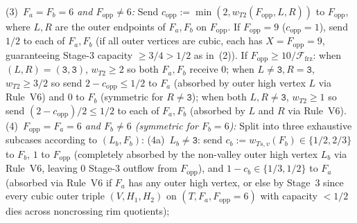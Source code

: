 \documentclass[11pt,reqno]{amsart}
\theoremstyle{plain}
\theoremstyle{definition}
\theoremstyle{remark}
\newcommand{\Ffrz}{\mathcal{F}_{\mathrm{frz}}}
\DeclareRobustCommand{\_}{\ifmmode\text{\textunderscore}\else\textunderscore\allowbreak\fi}
\begin{document}
\begin{itemize}[leftmargin=1.8em]
\begin{enumerate}[label=(\roman*),leftmargin=2.0em]
\begin{itemize}[leftmargin=1.4em]
          (3)~\emph{$F_a = F_b = 6$ and $F_{\mathrm{opp}} \neq 6$:} Send $c_{\mathrm{opp}} := \min(2, w_{T2}(F_{\mathrm{opp}}, L, R))$ to $F_{\mathrm{opp}}$, where $L, R$ are the outer endpoints of $F_a, F_b$ on $F_{\mathrm{opp}}$. If $F_{\mathrm{opp}} = 9$ ($c_{\mathrm{opp}} = 1$), send $1/2$ to each of $F_a, F_b$ (if all outer vertices are cubic, each has $X = F_{\mathrm{opp}} = 9$, guaranteeing Stage-3 capacity $\ge 3/4 > 1/2$ as in~(2)). If $F_{\mathrm{opp}} \ge 10/\Ffrz$: when $(L, R) = (\texttt{3}, \texttt{3})$, $w_{T2} \ge 2$ so both $F_a, F_b$ receive $0$; when $L \neq \texttt{3}, R = \texttt{3}$, $w_{T2} \ge 3/2$ so send $2 - c_{\mathrm{opp}} \le 1/2$ to $F_a$ (absorbed by outer high vertex $L$ via Rule~V6) and $0$ to $F_b$ (symmetric for $R \neq \texttt{3}$); when both $L, R \neq \texttt{3}$, $w_{T2} \ge 1$ so send $(2 - c_{\mathrm{opp}})/2 \le 1/2$ to each of $F_a, F_b$ (absorbed by $L$ and $R$ via Rule~V6).
          (4)~\emph{$F_{\mathrm{opp}} = F_a = 6$ and $F_b \neq 6$ (symmetric for $F_b = 6$):} Split into three exhaustive subcases according to $(L_b, F_b)$:
            (4a)~$L_b \neq \texttt{3}$: send $c_b := w_{Ts,v}(F_b) \in \{1/2, 2/3\}$ to $F_b$, $1$ to $F_{\mathrm{opp}}$ (completely absorbed by the non-valley outer high vertex $L_b$ via Rule~V6, leaving $0$ Stage-3 outflow from $F_{\mathrm{opp}}$), and $1 - c_b \in \{1/3, 1/2\}$ to $F_a$ (absorbed via Rule~V6 if $F_a$ has any outer high vertex, or else by Stage~3 since every cubic outer triple $(V, H_1, H_2)$ on $(T, F_a, F_{\mathrm{opp}}=6)$ with capacity $< 1/2$ dies across noncrossing rim quotients);

\end{itemize}
\end{enumerate}
\end{itemize}
\end{document}
